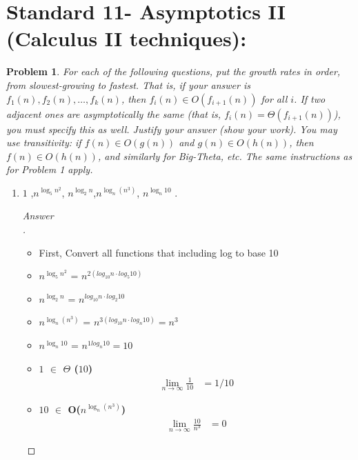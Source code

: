 \documentclass[11pt]{article}
\theoremstyle{definition}
\theoremstyle{definition}
\newtheorem{required}{Problem}
\theoremstyle{definition}
\begin{document}
\section{Standard 11- Asymptotics II (Calculus II techniques): }
\begin{required}



    {\itshape For each of the following questions, put the growth rates in order, from slowest-growing to fastest. That is, if your answer is $f_1(n), f_2(n), \dotsc, f_k(n)$, then $f_i(n) \in O(f_{i+1}(n))$ for all $i$. If two adjacent ones are asymptotically the same (that is, $f_i(n) = \Theta(f_{i+1}(n))$), you must specify this as well. 
    Justify your answer (show your work). You may use transitivity: if $f(n) \in O(g(n))$ and $g(n) \in O(h(n))$, then $f(n) \in O(h(n))$, and similarly for Big-Theta, etc. The same instructions as for Problem 1 apply.}
    \begin{enumerate}[label=(\alph*)]
\subsection{Problem 3\ref{2a}}
        \item \label{2a} $1$ ,\qquad $n^{\log_5 n^2}$, \qquad $n^{\log_2 n}$,\qquad  $n^{\log_n(n^3)}$, \qquad $ n^{\log_n 10}$ .
        \begin{proof}[Answer\\]
\begin{itemize}
\item First, Convert all functions that including log to base 10
\item $n^{\log_5 n^2}$ = $n^{2(log_{10} n\cdot log_5 10)}$
\item $n^{\log_2 n}$ = $n^{log_{10} n \cdot log_2 10}$
\item $n^{\log_n(n^3)}$ = $n^{3(log_{10} n\cdot log_n 10)} = n^3$
\item $n^{\log_n 10}$ = $ n^{1 log_n 10}= 10$

\item \textbf{$ 1$ $\in$ $\Theta$ ($10$)}
\begin{align*}
\lim_{n \to \infty} \frac {1}{10} 
&= 1/10
\end{align*}

\item \textbf{$10 $ $\in$ O($n^{\log_n(n^3)}$)}
\begin{align*}
\lim_{n \to \infty} \frac {10}{n^3} 
&= 0
\end{align*}


\end{itemize}
\end{proof}
\end{enumerate}
\end{required}
\end{document}
